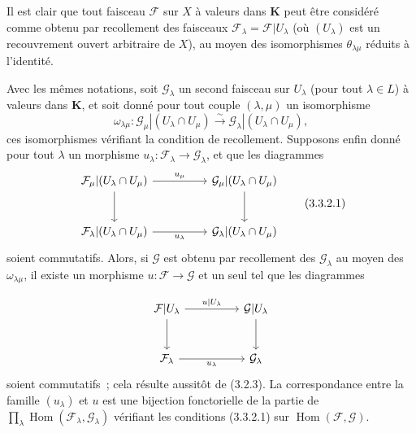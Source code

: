 \begin{env}[3.3.1]
Il est clair que tout faisceau $\mathcal{F}$ sur $X$ à valeurs dans
$\mathbf{K}$ peut être considéré comme obtenu par recollement des faisceaux
$\mathcal{F}_\lambda=\mathcal{F}|U_\lambda$ (où $(U_\lambda)$ est un
recouvrement ouvert arbitraire de $X$), au moyen des isomorphismes
$\theta_{\lambda\mu}$ réduits à l'identité.
\end{env}

\begin{env}[3.3.2]
\label{0.3.3.2-fr}
Avec les mêmes notations, soit $\mathcal{G}_\lambda$ un second faisceau sur
$U_\lambda$ (pour tout $\lambda\in L$) à valeurs dans $\mathbf{K}$, et soit
donné pour tout couple $(\lambda,\mu)$ un isomorphisme
\[
  \omega_{\lambda\mu}:
  \mathcal{G}_\mu|(U_\lambda\cap U_\mu)
  \xrightarrow{\sim}
  \mathcal{G}_\lambda|(U_\lambda\cap U_\mu),
\]
ces isomorphismes vérifiant la condition de recollement. Supposons enfin donné
pour tout $\lambda$ un morphisme
$u_\lambda:\mathcal{F}_\lambda\to\mathcal{G}_\lambda$, et que les diagrammes
\begin{equation}
\begin{tikzcd}[column sep=huge,row sep=large]
\mathcal{F}_\mu|(U_\lambda\cap U_\mu)
  \arrow[r,"u_\mu"] \arrow[d]
  & \mathcal{G}_\mu|(U_\lambda\cap U_\mu) \arrow[d] \\
\mathcal{F}_\lambda|(U_\lambda\cap U_\mu)
  \arrow[r,"u_\lambda"']
  & \mathcal{G}_\lambda|(U_\lambda\cap U_\mu)
\end{tikzcd}
\tag{3.3.2.1}\label{0.3.3.2.1-fr}
\end{equation}
soient commutatifs. Alors, si $\mathcal{G}$ est obtenu par recollement des
$\mathcal{G}_\lambda$ au moyen des $\omega_{\lambda\mu}$, il existe un
morphisme $u:\mathcal{F}\to\mathcal{G}$ et un seul tel que les diagrammes


\[
\begin{tikzcd}[column sep=huge,row sep=large]
\mathcal{F}|U_\lambda
  \arrow[r,"u|U_\lambda"] \arrow[d]
  & \mathcal{G}|U_\lambda \arrow[d] \\
\mathcal{F}_\lambda
  \arrow[r,"u_\lambda"']
  & \mathcal{G}_\lambda
\end{tikzcd}
\]
soient commutatifs~; cela résulte aussitôt de (3.2.3). La correspondance entre
la famille $(u_\lambda)$ et $u$ est une bijection fonctorielle de la partie de
$\prod_\lambda\operatorname{Hom}(\mathcal{F}_\lambda,\mathcal{G}_\lambda)$
vérifiant les conditions (3.3.2.1) sur
$\operatorname{Hom}(\mathcal{F},\mathcal{G})$.
\end{env}


